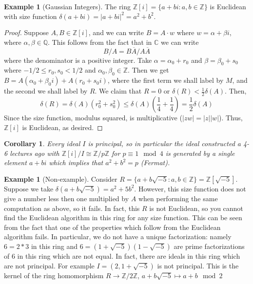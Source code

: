 \documentclass[12pt]{article}
\newtheorem{cor}[thm]{Corollary}
\theoremstyle{definition}
\newtheorem{eg}[thm]{Example}
\theoremstyle{remark}
\numberwithin{equation}{section}
\newcommand\C{\mathbb C}    %
\newcommand\Z{\mathbb Z}    %
\newcommand\Q{\mathbb Q}    %
\begin{document}
\vspace{15pt}

\begin{eg}[Gaussian Integers]
        The ring $\Z[i] = \{a+bi: a,b \in \Z\}$ is Euclidean with size function $\delta(a+bi) = |a+bi|^2 = a^2+b^2$.
\end{eg}
\begin{proof}
        Suppose $A,B \in \Z[i]$, and we can write $B = A\cdot w$ where $w = \alpha + \beta i$, where $\alpha,\beta \in \Q$. This follows from the fact that in $\C$ we can write $$B/A = B\overline{A}/A\overline{A}$$ where the denominator is a positive integer. Take $\alpha = \alpha_0 + r_0$ and $\beta = \beta_0 + s_0$ where $-1/2\leq r_0,s_0 < 1/2$ and $\alpha_0,\beta_0 \in \Z$. Then we get $B = A(\alpha_0+\beta_0i) + A(r_0+s_0i)$, where the first term we shall label by $M$, and the second we shall label by $R$. We claim that $R= 0$ or $\delta(R) < \frac{1}{2}\delta(A)$. Then, \begin{equation*}
                \delta(R) = \delta(A)(r_0^2+s_0^2) \leq \delta(A)(\frac{1}{4} + \frac{1}{4}) = \frac{1}{2}\delta(A)
        \end{equation*}
        Since the size function, modulus squared, is multiplicative ($|zw| = |z||w|$). Thus, $\Z[i]$ is Euclidean, as desired. 
\end{proof}



\vspace{15pt}

\begin{cor}
        Every ideal $I$ is principal, so in particular the ideal constructed a 4-6 lectures ago with $\Z[i]/I \cong \Z/p\Z$ for $p \equiv 1 \mod 4$ is generated by a single element $a+bi$ which implies that $a^2+b^2 = p$ (Fermat).
\end{cor}

\vspace{15pt}

\begin{eg}[Non-example]
        Consider $R = \{a+b\sqrt{-5}:a,b \in \Z\} = \Z[\sqrt{-5}]$. Suppose we take $\delta(a+b\sqrt{-5}) = a^2+5b^2$. However, this size function does not give a number less then one multiplied by $A$ when performing the same computation as above, so it fails. In fact, this $R$ is not Euclidean, so you cannot find the Euclidean algorithm in this ring for any size function. This can be seen from the fact that one of the properties which follow from the Euclidean algorithm fails. In particular, we do not have a unique factorization: namely $6 = 2*3$ in this ring and $6 = (1+\sqrt{-5})(1-\sqrt{-5})$ are prime factorizations of $6$ in this ring which are not equal. In fact, there are ideals in this ring which are not principal. For example $I = (2,1+\sqrt{-5})$ is not principal. This is the kernel of the ring homomorphism $R\rightarrow \Z/2\Z$, $a+b\sqrt{-5} \mapsto a+b \mod 2$
\end{eg}
\end{document}
